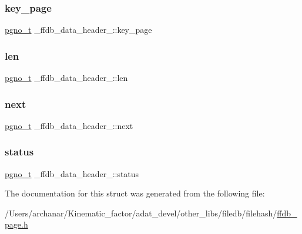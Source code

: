 \mbox{\label{struct__ffdb__data__header___a91aed66c809924649b60df3bc202f082}} 
\subsubsection{\texorpdfstring{key\_page}{key\_page}}
{\footnotesize\ttfamily \mbox{\hyperlink{other__libs_2filedb_2filehash_2ffdb__db_8h_a000813331643d38481142bcce7de1501}{pgno\+\_\+t}} \+\_\+ffdb\+\_\+data\+\_\+header\+\_\+\+::key\+\_\+page}

\mbox{\label{struct__ffdb__data__header___ae92f78b964c32a66a889e0f8926f39e9}} 
\subsubsection{\texorpdfstring{len}{len}}
{\footnotesize\ttfamily \mbox{\hyperlink{other__libs_2filedb_2filehash_2ffdb__db_8h_a000813331643d38481142bcce7de1501}{pgno\+\_\+t}} \+\_\+ffdb\+\_\+data\+\_\+header\+\_\+\+::len}

\mbox{\label{struct__ffdb__data__header___a6eec9d909ab0bdaa5d2290d815f9f90e}} 
\subsubsection{\texorpdfstring{next}{next}}
{\footnotesize\ttfamily \mbox{\hyperlink{other__libs_2filedb_2filehash_2ffdb__db_8h_a000813331643d38481142bcce7de1501}{pgno\+\_\+t}} \+\_\+ffdb\+\_\+data\+\_\+header\+\_\+\+::next}

\mbox{\label{struct__ffdb__data__header___a4c2b44b141df921e83933b19b1fd4e44}} 
\subsubsection{\texorpdfstring{status}{status}}
{\footnotesize\ttfamily \mbox{\hyperlink{other__libs_2filedb_2filehash_2ffdb__db_8h_a000813331643d38481142bcce7de1501}{pgno\+\_\+t}} \+\_\+ffdb\+\_\+data\+\_\+header\+\_\+\+::status}



The documentation for this struct was generated from the following file\+:\begin{DoxyCompactItemize}
\item 
/\+Users/archanar/\+Kinematic\+\_\+factor/adat\+\_\+devel/other\+\_\+libs/filedb/filehash/\mbox{\hyperlink{ffdb__page_8h}{ffdb\+\_\+page.\+h}}\end{DoxyCompactItemize}
